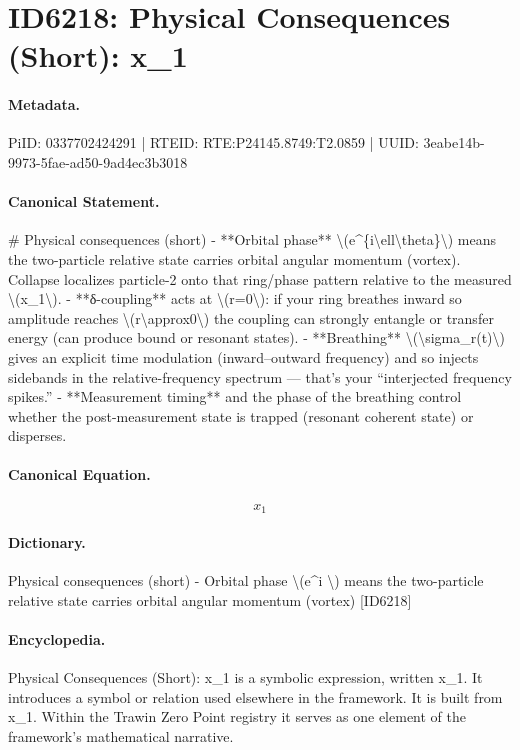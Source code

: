 \section*{ID6218: Physical Consequences (Short): x\_1}
\paragraph{Metadata.}
PiID: 0337702424291 | RTEID: RTE:P24145.8749:T2.0859 | UUID: 3eabe14b-9973-5fae-ad50-9ad4ec3b3018

\paragraph{Canonical Statement.}
\# Physical consequences (short) - **Orbital phase** \textbackslash{}(e\textasciicircum{}\{i\textbackslash{}ell\textbackslash{}theta\}\textbackslash{}) means the two-particle relative state carries orbital angular momentum (vortex). Collapse localizes particle-2 onto that ring/phase pattern relative to the measured \textbackslash{}(x\_1\textbackslash{}). - **δ-coupling** acts at \textbackslash{}(r=0\textbackslash{}): if your ring breathes inward so amplitude reaches \textbackslash{}(r\textbackslash{}approx0\textbackslash{}) the coupling can strongly entangle or transfer energy (can produce bound or resonant states). - **Breathing** \textbackslash{}(\textbackslash{}sigma\_r(t)\textbackslash{}) gives an explicit time modulation (inward–outward frequency) and so injects sidebands in the relative-frequency spectrum — that’s your “interjected frequency spikes.” - **Measurement timing** and the phase of the breathing control whether the post-measurement state is trapped (resonant coherent state) or disperses.

\paragraph{Canonical Equation.}
\[
x_1
\]

\paragraph{Dictionary.}
Physical consequences (short) - Orbital phase \textbackslash{}(e\textasciicircum{}i \textbackslash{}) means the two-particle relative state carries orbital angular momentum (vortex) [ID6218]

\paragraph{Encyclopedia.}
Physical Consequences (Short): x\_1 is a symbolic expression, written x\_1. It introduces a symbol or relation used elsewhere in the framework. It is built from x\_1. Within the Trawin Zero Point registry it serves as one element of the framework's mathematical narrative.
